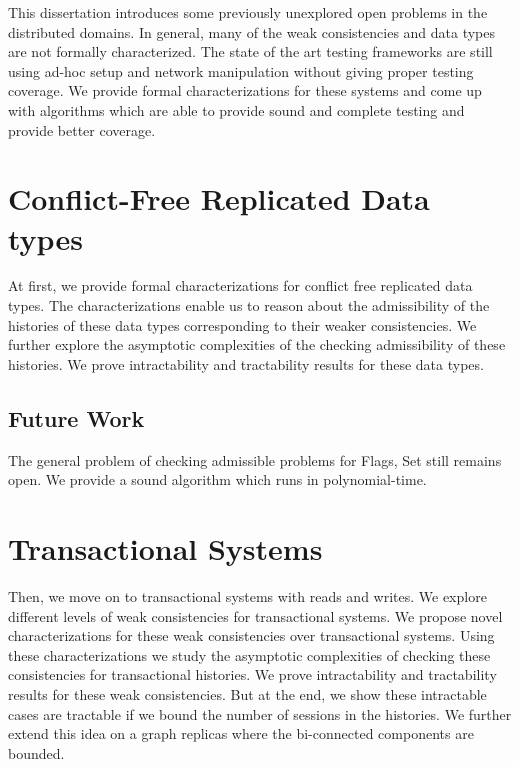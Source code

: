 
This dissertation introduces some previously unexplored open problems in the distributed domains. In general, many of the weak consistencies and data types are not formally characterized. The state of the art testing frameworks are still using ad-hoc setup and network manipulation without giving proper testing coverage. We provide formal characterizations for these systems and come up with algorithms which are able to provide sound and complete testing and provide better coverage.

\section{Conflict-Free Replicated Data types}

At first, we provide formal characterizations for conflict free replicated data types. The characterizations enable us to reason about the admissibility of the histories of these data types corresponding to their weaker consistencies. We further explore the asymptotic complexities of the checking admissibility of these histories. We prove intractability and tractability results for these data types.

\subsection{Future Work}

The general problem of checking admissible problems for Flags, Set still remains open. We provide a sound algorithm which runs in polynomial-time.


\section{Transactional Systems}

Then, we move on to transactional systems with reads and writes. We explore different levels of weak consistencies for transactional systems. We propose novel characterizations for these weak consistencies over transactional systems. Using these characterizations we study the asymptotic complexities of checking these consistencies for transactional histories. We prove intractability and tractability results for these weak consistencies. But at the end, we show these intractable cases are tractable if we bound the number of sessions in the histories. We further extend this idea on a graph replicas where the bi-connected components are bounded.

